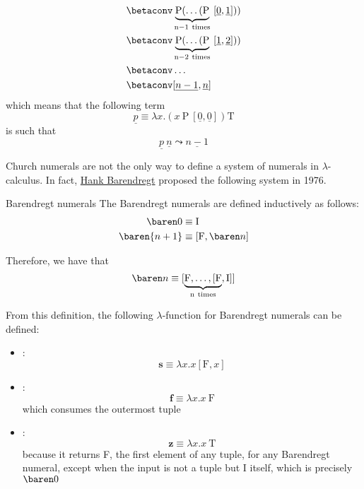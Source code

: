 \documentclass[a4paper, 12pt]{report}
\begin{document}
\begin{itemize}
\begin{equation*}
\begin{split}
                                                                            &\betaconv \underbrace{\mathrm P( \ldots (\mathrm P}_{\mathrm{n - 1 \ times}} \ [\underline 0, \underline 1])) \\
                                                                            &\betaconv \underbrace{\mathrm P( \ldots (\mathrm P}_{\mathrm{n - 2 \ times}} \ [\underline 1, \underline 2])) \\
                                                                            &\betaconv \ldots \\
                                                                            &\betaconv [\underline{n - 1}, \underline n]
                \end{split}
            \end{equation*}
            which means that the following term $$\underline p \equiv \lambda x . (x \ \mathrm P \ [\underline 0, \underline 0]) \mathrm T$$ is such that $$\underline p \ \underline n \leadsto \underline{n - 1}$$
    \end{itemize}

    Church numerals are not the only way to define a system of numerals in $\lambda$-calculus. In fact, \href{https://en.wikipedia.org/wiki/Henk_Barendregt}{Hank Barendregt} proposed the following system in 1976.

    \begin{frameddefn}{Barendregt numerals}
        The Barendregt numerals are defined inductively as follows:
        \begin{equation*}
            \begin{split}
                \baren 0 &\equiv \mathrm I \\
                \baren {n + 1} &\equiv [\mathrm F, \baren n]
            \end{split}
        \end{equation*}
    \end{frameddefn}
    
    Therefore, we have that $$\baren n \equiv [\underbrace{\mathrm F, \ldots, [\mathrm F}_{\mathrm{n \ times}}, \mathrm I]]$$

    From this definition, the following $\lambda$-function for Barendregt numerals can be defined:

    \begin{itemize}
        \item {}: $$\mathbf s \equiv \lambda x. x[\mathrm F, x]$$
        \item {}: $$\mathbf f \equiv \lambda x.x \ \mathrm F$$ which consumes the outermost tuple
        \item {}: $$\mathbf z \equiv \lambda x.x \ \mathrm T$$ because it returns F, the first element of any tuple, for any Barendregt numeral, except when the input is not a tuple but I itself, which is precisely $\baren 0$
    \end{itemize}
\end{document}
